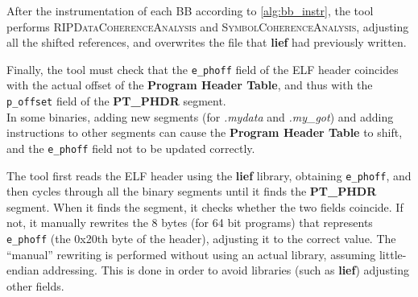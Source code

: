 After the instrumentation of each \gls{BB} according to \cref{alg:bb_instr}, the tool performs
\textsc{RIPDataCoherenceAnalysis} and \textsc{SymbolCoherenceAnalysis}, adjusting all the shifted references,
and overwrites the file that \textbf{lief} had previously written.

Finally, the tool must check that the \texttt{e\_phoff} field of the \gls{ELF} header coincides with
the actual offset of the \textbf{Program Header Table}, and thus with the \texttt{p\_offset} field of the
\textbf{PT\_PHDR} segment.\\
In some binaries, adding new segments (for \textit{.mydata} and \textit{.my\_got}) and adding instructions to other segments
can cause the \textbf{Program Header Table} to shift, and the \texttt{e\_phoff} field not to be updated correctly.

The tool first reads the \gls{ELF} header using the \textbf{lief} library, obtaining \texttt{e\_phoff}, and then
cycles through all the binary segments until it finds the \textbf{PT\_PHDR} segment. When it finds the segment, it checks
whether the two fields coincide.
If not, it manually rewrites the 8 bytes (for 64 bit programs) 
that represents \texttt{e\_phoff} (the 0x20th byte of the header), adjusting it to the correct value.
The ``manual'' rewriting is performed without using an actual library, assuming little-endian addressing.
This is done in order to avoid libraries (such as \textbf{lief}) adjusting other fields.